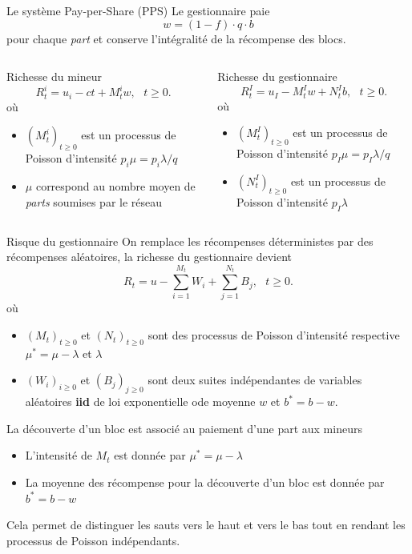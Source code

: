 \documentclass{beamer}
\makeatletter
\newcommand*{\iid}{\textbf{iid}\@\xspace}
\makeatother
\begin{document}
\begin{frame}{Le système Pay-per-Share (PPS) }
\scriptsize
Le gestionnaire paie
$$
w = (1-f)\cdot q \cdot b 
$$ 
pour chaque \textit{part} et conserve l'intégralité de la récompense des blocs.
\vspace{1cm}
\begin{columns}
\begin{column}{0.5\textwidth}
Richesse du mineur
$$
R_t^i = u_i-ct + M_t^i w,\text{ }t\geq0.
$$
où 
\begin{itemize}
   \item $(M_t^i)_{t\geq0}$ est un processus de Poisson d'intensité $p_i \mu= p_i\lambda / q$
   \item $\mu$ correspond au nombre moyen de \textit{parts} soumises par le réseau 
\end{itemize}
\end{column}
\begin{column}{0.5\textwidth}
Richesse du gestionnaire
$$
R_t^I = u_I - M_t^I w+N_t^I b,\text{ }t\geq0.
$$
où 
\begin{itemize}
   \item $(M_t^I)_{t\geq0}$ est un processus de Poisson d'intensité $p_I\mu =p_I\lambda / q$
   \item $(N_t^I)_{t\geq0}$ est un processus de Poisson d'intensité $p_I\lambda$
\end{itemize}
\end{column}
\end{columns}
\end{frame}
\begin{frame}{Risque du gestionnaire}
\scriptsize
On remplace les récompenses déterministes par des récompenses aléatoires, la richesse du gestionnaire devient
$$
R_t= u - \sum_{i=1}^{M_t} W_i +\sum_{j=1}^{N_t} B_j,\text{ }t\geq0.
$$
où 
\begin{itemize}
  \item $(M_t)_{t\geq0}$ et $(N_t)_{t\geq0}$ sont des processus de Poisson d'intensité respective $\mu^\ast=\mu- \lambda$ et $\lambda$
  \item $(W_i)_{i\geq0}$ et $(B_j)_{j\geq0}$ sont deux suites indépendantes de variables aléatoires  \iid  de loi exponentielle ode moyenne $w$ et $b^\ast = b-w$.
\end{itemize}
\begin{tcolorbox}[enhanced,drop shadow, title=Superposition de processus de Poisson]
La découverte d'un bloc est associé au paiement d'une part aux mineurs
\begin{itemize}
\item L'intensité de $M_t$ est donnée par $\mu^\ast=\mu- \lambda$ 
\item La moyenne des récompense pour la découverte d'un bloc est donnée par $b^\ast = b-w$ 
\end{itemize}
Cela permet de distinguer les sauts vers le haut et vers le bas tout en rendant les processus de Poisson indépendants. 
\end{tcolorbox}
\end{frame}
\end{document}
